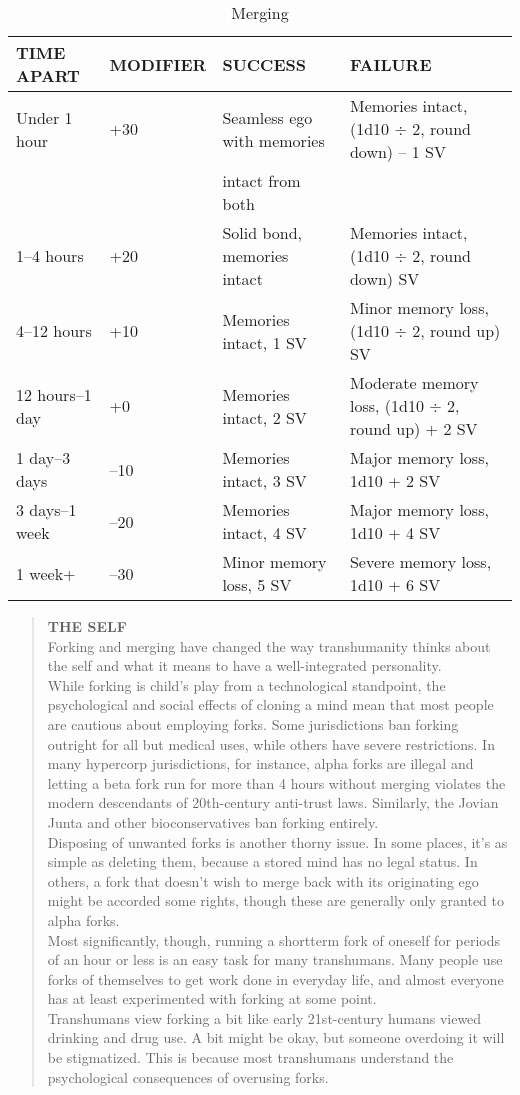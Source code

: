 \begin{table}
\caption{Merging}
\begin{tabular}{|l|l|l|l|}
\hline
TIME APART & MODIFIER & SUCCESS & FAILURE \\
\hline
Under 1 hour & +30 & Seamless ego with memories & Memories intact, (1d10 $\div$ 2, round down) – 1 SV \\
& & intact from both &\\
\hline
1–4 hours & +20 & Solid bond, memories intact & Memories intact, (1d10 $\div$ 2, round down) SV \\
\hline
4–12 hours & +10 & Memories intact, 1 SV & Minor memory loss, (1d10 $\div$ 2, round up) SV \\
\hline
12 hours–1 day & +0 & Memories intact, 2 SV & Moderate memory loss, (1d10 $\div$ 2, round up) + 2 SV \\
\hline
1 day–3 days & –10 & Memories intact, 3 SV & Major memory loss, 1d10 + 2 SV \\
\hline
3 days–1 week & –20 & Memories intact, 4 SV & Major memory loss, 1d10 + 4 SV \\
\hline
1 week+ & –30 & Minor memory loss, 5 SV & Severe memory loss, 1d10 + 6 SV \\
\hline
\end{tabular}
\label{table:merging}
\end{table}

\begin{quotation}
\textbf{THE SELF}
\\
Forking and merging have changed the way
transhumanity thinks about the self and what
it means to have a well-integrated personality. \\
While forking is child’s play from a technological
standpoint, the psychological and
social effects of cloning a mind mean that
most people are cautious about employing
forks. Some jurisdictions ban forking outright
for all but medical uses, while others have
severe restrictions. In many hypercorp jurisdictions,
for instance, alpha forks are illegal
and letting a beta fork run for more than 4
hours without merging violates the modern
descendants of 20th-century anti-trust laws.
Similarly, the Jovian Junta and other bioconservatives
ban forking entirely. \\
Disposing of unwanted forks is another
thorny issue. In some places, it’s as simple as
deleting them, because a stored mind has no
legal status. In others, a fork that doesn’t wish
to merge back with its originating ego might
be accorded some rights, though these are
generally only granted to alpha forks. \\
Most significantly, though, running a shortterm
fork of oneself for periods of an hour
or less is an easy task for many transhumans.
Many people use forks of themselves to get
work done in everyday life, and almost everyone
has at least experimented with forking at
some point. \\
Transhumans view forking a bit like early
21st-century humans viewed drinking and drug
use. A bit might be okay, but someone overdoing
it will be stigmatized. This is because most
transhumans understand the psychological
consequences of overusing forks.
\end{quotation}

